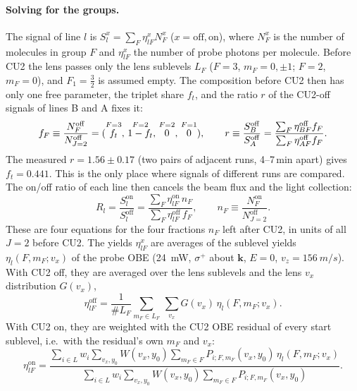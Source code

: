 \documentclass[11pt,a4paper,oneside]{report}
\begin{document}
\paragraph{Solving for the groups.} The signal of line $l$ is $S^x_l=\sum_F\eta^x_{lF}N^x_F$ ($x=\mathrm{off},\mathrm{on}$),
where $N^x_F$ is the number of molecules in group $F$ and $\eta^x_{lF}$ the number of probe photons per
molecule. Before CU2 the lens passes only the lens sublevels $L_F$ ($F=3$, $m_F=0,\pm1$; $F=2$,
$m_F=0$), and $F_1=\tfrac32$ is assumed empty. The composition before CU2 then has only one free
parameter, the triplet share $f_t$, and the ratio $r$ of the CU2-off signals of lines B and A fixes
it:
\begin{equation}
  f_F\equiv\frac{N^{\mathrm{off}}_F}{N^{\mathrm{off}}_{J=2}}=(\overset{\scriptstyle F=3}{\mathstrut f_t},\,\overset{\scriptstyle F=2}{\mathstrut 1-f_t},\,
    \overset{\scriptstyle F=2}{\mathstrut 0},\,\overset{\scriptstyle F=1}{\mathstrut 0}),\qquad
  r\equiv\frac{S^{\mathrm{off}}_B}{S^{\mathrm{off}}_A}=\frac{\sum_F\eta^{\mathrm{off}}_{BF}f_F}{\sum_F\eta^{\mathrm{off}}_{AF}f_F}.
  \label{eq:ft}
\end{equation}
The measured $r=1.56\pm0.17$ (two pairs of adjacent runs, 4--7\,min apart) gives $f_t=0.441$. This
is the only place where signals of different runs are compared. The on/off ratio of each line then
cancels the beam flux and the light collection:
\begin{equation}
  R_l=\frac{S^{\mathrm{on}}_l}{S^{\mathrm{off}}_l}=\frac{\sum_F\eta^{\mathrm{on}}_{lF}\,n_F}{\sum_F\eta^{\mathrm{off}}_{lF}\,f_F},
  \qquad n_F\equiv\frac{N^{\mathrm{on}}_F}{N^{\mathrm{off}}_{J=2}}.
  \label{eq:Rl}
\end{equation}
These are four equations for the four fractions $n_F$ left after CU2, in units of all $J=2$ before
CU2. The yields $\eta^x_{lF}$ are averages of the sublevel yields $\eta_l(F,m_F;v_x)$ of the probe OBE
(\SI{24}{mW}, $\sigma^+$ about $\mathbf k$, $E=0$, $v_z=\SI{156}{m/s}$). With CU2 off, they are
averaged over the lens sublevels and the lens $v_x$ distribution $G(v_x)$,
\begin{equation}
  \eta^{\mathrm{off}}_{lF}=\frac{1}{\#L_F}\sum_{m_F\in L_F}\,\sum_{v_x}G(v_x)\,\eta_l(F,m_F;v_x).
  \label{eq:eta}
\end{equation}
With CU2 on, they are weighted with the CU2 OBE residual of every start sublevel, i.e.\ with the
residual's own $m_F$ and $v_x$:
\begin{equation}
  \eta^{\mathrm{on}}_{lF}=\frac{\sum_{i\in L}w_i\sum_{v_x,y_0}W(v_x,y_0)\sum_{m_F\in F}P_{i;F,m_F}(v_x,y_0)\,
  \eta_l(F,m_F;v_x)}{\sum_{i\in L}w_i\sum_{v_x,y_0}W(v_x,y_0)\sum_{m_F\in F}P_{i;F,m_F}(v_x,y_0)}.
  \label{eq:etaon}
\end{equation}
\end{document}
